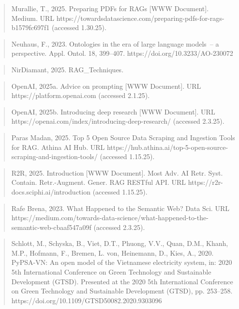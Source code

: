 \documentclass[a4paper,11pt]{report}
\begin{document}
\begin{quote}
Murallie, T., 2025. Preparing PDFs for RAGs {[}WWW Document{]}. Medium. URL https://towardsdatascience.com/preparing-pdfs-for-rags-b1579fc697f1 (accessed 1.30.25).
\end{quote}

\begin{quote}
Neuhaus, F., 2023. Ontologies in the era of large language models~-- a perspective. Appl. Ontol. 18, 399--407. https://doi.org/10.3233/AO-230072
\end{quote}

\begin{quote}
NirDiamant, 2025. RAG\_Techniques.
\end{quote}

\begin{quote}
OpenAI, 2025a. Advice on prompting {[}WWW Document{]}. URL https://platform.openai.com (accessed 2.1.25).
\end{quote}

\begin{quote}
OpenAI, 2025b. Introducing deep research {[}WWW Document{]}. URL https://openai.com/index/introducing-deep-research/ (accessed 2.3.25).
\end{quote}

\begin{quote}
Paras Madan, 2025. Top 5 Open Source Data Scraping and Ingestion Tools for RAG. Athina AI Hub. URL https://hub.athina.ai/top-5-open-source-scraping-and-ingestion-tools/ (accessed 1.15.25).
\end{quote}

\begin{quote}
R2R, 2025. Introduction {[}WWW Document{]}. Most Adv. AI Retr. Syst. Contain. Retr.-Augment. Gener. RAG RESTful API. URL https://r2r-docs.sciphi.ai/introduction (accessed 1.15.25).
\end{quote}

\begin{quote}
Rafe Brena, 2023. What Happened to the Semantic Web? Data Sci. URL https://medium.com/towards-data-science/what-happened-to-the-semantic-web-cbaaf547a09f (accessed 2.3.25).
\end{quote}

\begin{quote}
Schlott, M., Schyska, B., Viet, D.T., Phuong, V.V., Quan, D.M., Khanh, M.P., Hofmann, F., Bremen, L. von, Heinemann, D., Kies, A., 2020. PyPSA-VN: An open model of the Vietnamese electricity system, in: 2020 5th International Conference on Green Technology and Sustainable Development (GTSD). Presented at the 2020 5th International Conference on Green Technology and Sustainable Development (GTSD), pp. 253--258. https://doi.org/10.1109/GTSD50082.2020.9303096
\end{quote}
\end{document}
